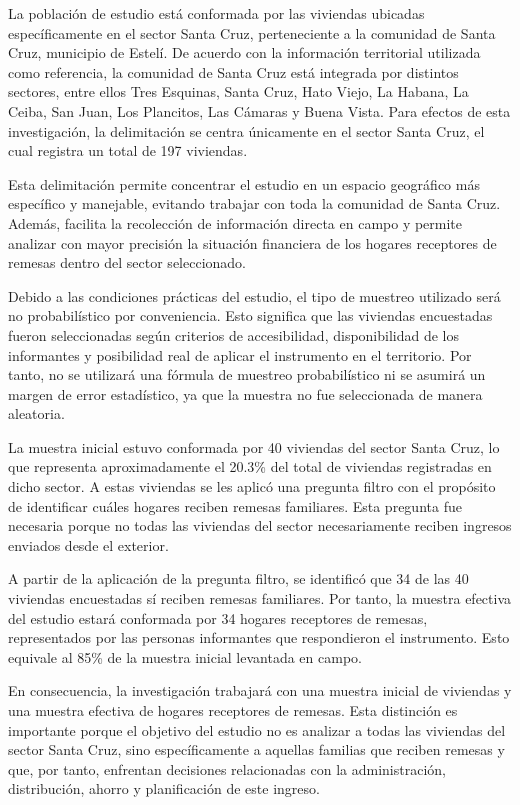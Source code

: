 \documentclass[12pt,letterpaper]{article}
\begin{document}
La población de estudio está conformada por las viviendas ubicadas específicamente en el sector Santa Cruz, perteneciente a la comunidad de Santa Cruz, municipio de Estelí. De acuerdo con la información territorial utilizada como referencia, la comunidad de Santa Cruz está integrada por distintos sectores, entre ellos Tres Esquinas, Santa Cruz, Hato Viejo, La Habana, La Ceiba, San Juan, Los Plancitos, Las Cámaras y Buena Vista. Para efectos de esta investigación, la delimitación se centra únicamente en el sector Santa Cruz, el cual registra un total de 197 viviendas.

Esta delimitación permite concentrar el estudio en un espacio geográfico más específico y manejable, evitando trabajar con toda la comunidad de Santa Cruz. Además, facilita la recolección de información directa en campo y permite analizar con mayor precisión la situación financiera de los hogares receptores de remesas dentro del sector seleccionado.

Debido a las condiciones prácticas del estudio, el tipo de muestreo utilizado será no probabilístico por conveniencia. Esto significa que las viviendas encuestadas fueron seleccionadas según criterios de accesibilidad, disponibilidad de los informantes y posibilidad real de aplicar el instrumento en el territorio. Por tanto, no se utilizará una fórmula de muestreo probabilístico ni se asumirá un margen de error estadístico, ya que la muestra no fue seleccionada de manera aleatoria.

La muestra inicial estuvo conformada por 40 viviendas del sector Santa Cruz, lo que representa aproximadamente el 20.3\% del total de viviendas registradas en dicho sector. A estas viviendas se les aplicó una pregunta filtro con el propósito de identificar cuáles hogares reciben remesas familiares. Esta pregunta fue necesaria porque no todas las viviendas del sector necesariamente reciben ingresos enviados desde el exterior.

A partir de la aplicación de la pregunta filtro, se identificó que 34 de las 40 viviendas encuestadas sí reciben remesas familiares. Por tanto, la muestra efectiva del estudio estará conformada por 34 hogares receptores de remesas, representados por las personas informantes que respondieron el instrumento. Esto equivale al 85\% de la muestra inicial levantada en campo.

En consecuencia, la investigación trabajará con una muestra inicial de viviendas y una muestra efectiva de hogares receptores de remesas. Esta distinción es importante porque el objetivo del estudio no es analizar a todas las viviendas del sector Santa Cruz, sino específicamente a aquellas familias que reciben remesas y que, por tanto, enfrentan decisiones relacionadas con la administración, distribución, ahorro y planificación de este ingreso.
\end{document}
